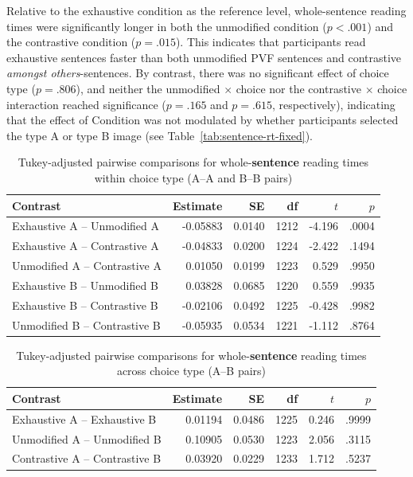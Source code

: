 \documentclass[a4paper, ruler]{CUP-JNL-LIN}%
\begin{document}
Relative to the exhaustive condition as the reference level, whole-sentence reading times were significantly longer in both the unmodified condition ($p<.001$) and the contrastive condition ($p=.015$). This indicates that participants read exhaustive sentences faster than both unmodified PVF sentences and contrastive \textit{amongst others}-sentences. By contrast, there was no significant effect of choice type ($p=.806$), and neither the unmodified $\times$ choice nor the contrastive $\times$ choice interaction reached significance ($p=.165$ and $p=.615$, respectively), indicating that the effect of Condition was not modulated by whether participants selected the type A or type B image (see Table~\ref{tab:sentence-rt-fixed}).

\begin{table}[htbp]
\centering
\caption{Tukey-adjusted pairwise comparisons for whole-\textbf{sentence} reading times within choice type (A--A and B--B pairs)}
\label{tab:sentence-rt-pairwise-within-choice}
\begin{tabularx}{\textwidth}{@{}Xrrrrr@{}}
\toprule
Contrast & Estimate & SE & df & $t$ & $p$ \\
\midrule
Exhaustive A -- Unmodified A   & -0.05883 & 0.0140 & 1212 & -4.196 & .0004 \\
Exhaustive A -- Contrastive A  & -0.04833 & 0.0200 & 1224 & -2.422 & .1494 \\
Unmodified A -- Contrastive A  &  0.01050 & 0.0199 & 1223 &  0.529 & .9950 \\
Exhaustive B -- Unmodified B   &  0.03828 & 0.0685 & 1220 &  0.559 & .9935 \\
Exhaustive B -- Contrastive B  & -0.02106 & 0.0492 & 1225 & -0.428 & .9982 \\
Unmodified B -- Contrastive B  & -0.05935 & 0.0534 & 1221 & -1.112 & .8764 \\
\bottomrule
\end{tabularx}
\end{table}

\begin{table}[htbp]
\centering
\caption{Tukey-adjusted pairwise comparisons for whole-\textbf{sentence} reading times across choice type (A--B pairs)}
\label{tab:sentence-rt-pairwise-across-choice}
\begin{tabularx}{\textwidth}{@{}Xrrrrr@{}}
\toprule
Contrast & Estimate & SE & df & $t$ & $p$ \\
\midrule
Exhaustive A -- Exhaustive B   &  0.01194 & 0.0486 & 1225 &  0.246 & .9999 \\
Unmodified A -- Unmodified B   &  0.10905 & 0.0530 & 1223 &  2.056 & .3115 \\
Contrastive A -- Contrastive B &  0.03920 & 0.0229 & 1233 &  1.712 & .5237 \\
\bottomrule
\end{tabularx}
\end{table}
\end{document}
